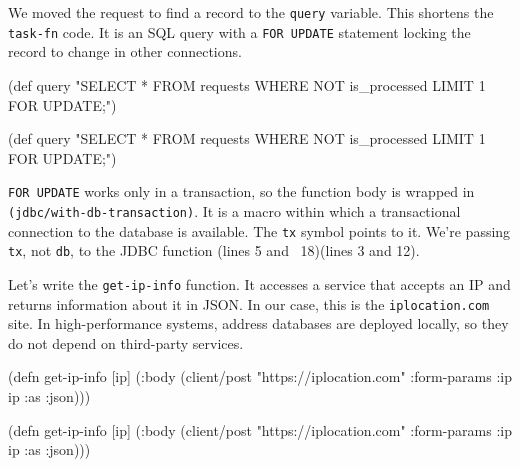 \fi


We moved the request to find a record to the \verb|query| variable. This shortens the \verb|task-fn| code. It is an SQL query with a \verb|FOR UPDATE| statement locking the record to change in other connections.

\ifnarrow

\begin{english}
  \begin{clojure}
(def query
  "SELECT * FROM requests
   WHERE NOT is_processed
   LIMIT 1 FOR UPDATE;")
  \end{clojure}
\end{english}

\else

\begin{english}
  \begin{clojure}
(def query
  "SELECT * FROM requests WHERE NOT is_processed
   LIMIT 1 FOR UPDATE;")
  \end{clojure}
\end{english}

\fi

\verb|FOR UPDATE| works only in a transaction, so the function body is wrapped in \texttt{(jdbc/with\--db-transaction)}. It is a macro within which a transactional connection to the database is available. The \verb|tx| symbol points to it. We're passing \verb|tx|, not \verb|db|, to the JDBC function \ifnarrow(lines 5 and ~18)\else(lines 3 and 12)\fi.


Let's write the \verb|get-ip-info| function. It accesses a service that accepts an IP and returns information about it in JSON. In our case, this is the \verb|iplocation.com| site. In high-performance systems, address databases are deployed locally, so they do not depend on third-party services.

\ifnarrow

\begin{english}
  \begin{clojure}
(defn get-ip-info [ip]
  (:body (client/post
           "https://iplocation.com"
           {:form-params {:ip ip}
            :as :json})))
  \end{clojure}
\end{english}

\else

\begin{english}
  \begin{clojure}
(defn get-ip-info [ip]
  (:body (client/post "https://iplocation.com"
                      {:form-params {:ip ip}
                       :as :json})))
  \end{clojure}
\end{english}

